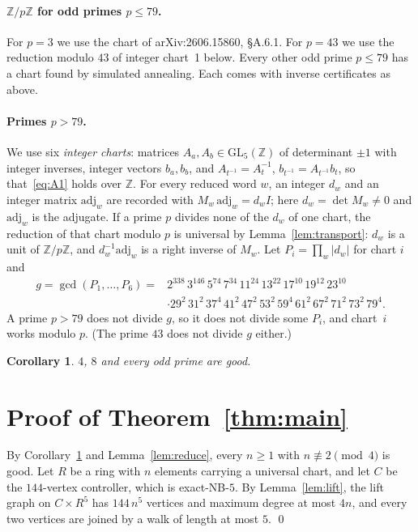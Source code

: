 \documentclass[11pt]{article}
\newtheorem{corollary}[theorem]{Corollary}
\theoremstyle{definition}
\theoremstyle{remark}
\newcommand{\Z}{\mathbb{Z}}
\newcommand{\GL}{\mathrm{GL}}
\begin{document}
\paragraph{$\Z/p\Z$ for odd primes $p\le 79$.} For $p=3$ we use the chart of
arXiv:2606.15860, \S A.6.1. For $p=43$ we use the reduction modulo $43$ of
integer chart~1 below. Every other odd prime $p\le 79$ has a chart found by
simulated annealing. Each comes with inverse certificates as above.

\paragraph{Primes $p>79$.} We use six \emph{integer charts}: matrices
$A_a,A_b\in\GL_5(\Z)$ of determinant $\pm1$ with integer inverses, integer
vectors $b_a,b_b$, and $A_{t^{-1}}=A_t^{-1}$, $b_{t^{-1}}=A_{t^{-1}}b_t$, so
that~\eqref{eq:A1} holds over $\Z$. For every reduced word $w$, an integer
$d_w$ and an integer matrix $\mathrm{adj}_w$ are recorded with
$M_w\,\mathrm{adj}_w=d_wI$; here $d_w=\det M_w\ne 0$ and $\mathrm{adj}_w$ is the
adjugate. If a prime $p$ divides none of the $d_w$ of one chart, the
reduction of that chart modulo $p$ is universal by
Lemma~\ref{lem:transport}: $d_w$ is a unit of $\Z/p\Z$, and
$d_w^{-1}\mathrm{adj}_w$ is a right inverse of $M_w$. Let $P_i=\prod_w |d_w|$ for
chart $i$ and
\[
  \begin{aligned}
  g=\gcd(P_1,\dots,P_6)={}&2^{338}\,3^{146}\,5^{74}\,7^{34}\,11^{24}\,13^{22}\,17^{10}\,19^{12}\,23^{10}\\
  &\cdot 29^2\,31^2\,37^4\,41^2\,47^2\,53^2\,59^4\,61^2\,67^2\,71^2\,73^2\,79^4 .
  \end{aligned}
\]
A prime $p>79$ does not divide $g$, so it does not divide some $P_i$, and
chart~$i$ works modulo $p$. (The prime $43$ does not divide $g$ either.)

\begin{corollary}\label{cor:blocks}
$4$, $8$ and every odd prime are good.
\end{corollary}

\section{Proof of Theorem~\ref{thm:main}}\label{sec:proof}

By Corollary~\ref{cor:blocks} and Lemma~\ref{lem:reduce}, every $n\ge 1$ with
$n\not\equiv 2\pmod 4$ is good. Let $R$ be a ring with $n$ elements carrying
a universal chart, and let $C$ be the $144$-vertex controller, which is
exact-NB-$5$. By Lemma~\ref{lem:lift}, the lift graph on $C\times R^5$ has
$144\,n^5$ vertices and maximum degree at most $4n$, and every two vertices
are joined by a walk of length at most $5$. \qed
\end{document}
